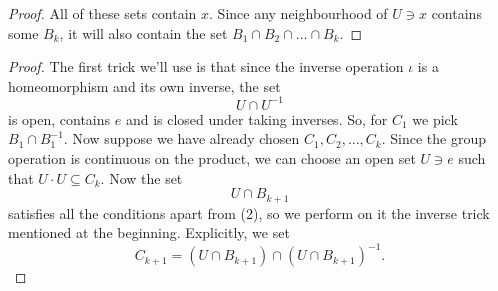 
\begin{proof}
    All of these sets contain \( x \). Since any neighbourhood of \( U \ni x \) contains some \( B_k \), it will also contain the set \( B_1 \cap B_2 \cap \ldots \cap B_k \).
\end{proof}


\begin{proof}
    The first trick we'll use is that since the inverse operation \( \iota \) is a homeomorphism and its own inverse, the set 
    \[ 
        U \cap U^{-1} 
   \]
   is open, contains \( e \) and is closed under taking inverses. So, for \( C_1 \) we pick \( B_1 \cap B_1^{-1} \). Now suppose we have already chosen \( C_1, C_2, \ldots, C_k \). Since the group operation is continuous on the product, we can choose an open set \( U \ni e \) such that \( U \cdot U \subseteq C_k \). Now the set
   \[ 
       U \cap B_{k+1} 
  \]
  satisfies all the conditions apart from (2), so we perform on it the inverse trick mentioned at the beginning. Explicitly, we set
  \[ 
      C_{k+1} = (U \cap B_{k+1}) \cap (U \cap B_{k+1})^{-1}.
 \]
\end{proof}

